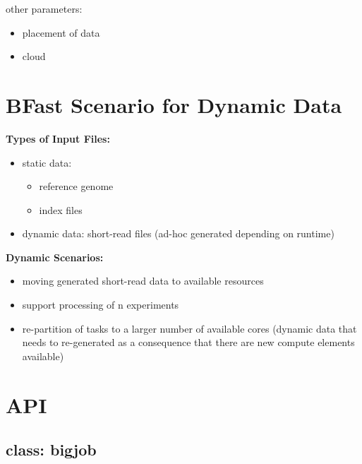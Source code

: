 \documentclass[]{article}
\begin{document}
other parameters:
\begin{itemize}
	\item placement of data
	\item cloud
\end{itemize}

\section{BFast Scenario for Dynamic Data}

\textbf{Types of Input Files:}
\begin{itemize}
	\item static data: 
	\begin{itemize}
		\item reference genome
		\item index files
	\end{itemize}
	\item dynamic data: short-read files (ad-hoc generated depending on runtime)
\end{itemize}

\noindent
\textbf{Dynamic Scenarios:}
\begin{itemize}
	\item moving generated short-read data to available resources
	
	\item support processing of n experiments 

	\item re-partition of tasks to a larger number of available cores (dynamic data that needs to re-generated as a consequence that there are new compute elements available)

\end{itemize}

\section{API}

\subsection{class: bigjob}
\end{document}
